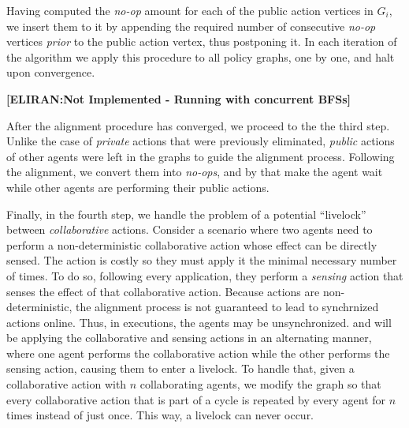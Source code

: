 \documentclass[letterpaper]{article} %
\theoremstyle{definition}
\newcommand{\eliran}[1]{\textbf{[\color{red}ELIRAN:#1]}}
\begin{document}
{Having computed the  {\em no-op} amount for each of the public action vertices in $G_i$, we insert them to it by appending the required number of consecutive {\em no-op} vertices \emph{prior} to the public action vertex, thus postponing it.
In each iteration of the algorithm we apply this procedure to all policy graphs, one by one, and halt upon convergence.

\eliran{Not Implemented - Running with concurrent BFSs}

After the alignment procedure has converged, we proceed to the the third step. Unlike the case of \emph{private} actions that were previously eliminated, \emph{public} actions of other agents were left in the graphs to guide the alignment process. Following the alignment, we convert them into \emph{no-ops}, and by that make the agent wait while other agents are performing their public actions.

Finally, in the fourth step, we handle the problem of a potential ``livelock''
between \emph{collaborative} actions. Consider a scenario where two agents need to perform a non-deterministic collaborative action whose effect can be directly sensed. The action is costly so they must apply it the minimal necessary number of times. To do so, following every application, they perform a \emph{sensing} action that senses the effect of that collaborative action.
Because actions are non-deterministic, the alignment process is
not guaranteed to lead to synchrnized actions online.
Thus, in 
executions, the agents may be unsynchronized. 
and will be applying the collaborative and sensing actions in an alternating manner, where one agent performs the collaborative action while the other performs the sensing action, causing them to enter a livelock. To handle that, given a collaborative action with $n$ collaborating agents, we modify the graph so that every collaborative action that is part of a cycle is repeated by every agent for $n$ times instead of just once. This way, a livelock can never occur.
}
\end{document}
